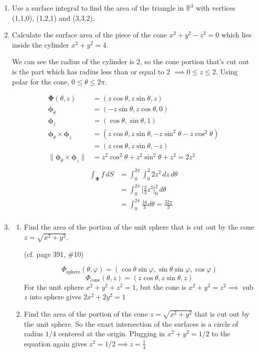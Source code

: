\documentclass{article}
\newcommand{\norm}[1]{\| #1 \|}
\begin{document}
\begin{enumerate}
    \item Use a surface integral to find the area of the triangle in $\mathbb{R}^3$ with vertices (1,1,0), (1,2,1) and (3,3,2).

    \item Calculate the surface area of the piece of the cone $x^2+y^2-z^2 =0$ which lies inside the cylinder $x^2 + y^2 = 4$.
    
    We can see the radius of the cylinder is 2, so the cone portion that's cut out is the part which has radius less than or equal to 2 $\implies 0 \leq z \leq 2$. Using polar for the cone, $0 \leq \theta \leq 2 \pi$.
    \begin{multicols}{2}
    \noindent
    \begin{align*}
        \boldsymbol \Phi (\theta, z) &= (z\cos \theta, z\sin \theta, z) \\
        \boldsymbol \phi_\theta &= (- z \sin \theta, z \cos \theta, 0) \\
        \boldsymbol \phi_z &= ( \cos \theta, \sin \theta, 1) \\
        \boldsymbol \phi_\theta \times \boldsymbol \phi_z &= (z \cos \theta, z \sin \theta, - z \sin^2 \theta - z \cos^2 \theta) \\
        &= (z \cos \theta, z \sin \theta, - z)  \\
        \norm {\boldsymbol \phi_\theta \times \boldsymbol \phi_z }&= z^2 \cos^2 \theta + z^2 \sin^2 \theta + z^2  = 2 z^2\\
    \end{align*}
    \begin{align*}
        \int_{\boldsymbol \Phi} f \, dS &= \int_0^{2\pi} \int_0^2 2z^2 \, dz \, d\theta \\
        &= \int_0^{2\pi} \Big[ \frac{2}{3}z^3\Big]_0^2 \, d\theta \\
        &= \int_0^{2\pi} \frac{16}{3} d\theta =\frac{32\pi}{3} \\
    \end{align*}
    \end{multicols}
    \item
    \begin{enumerate}
        \item Find the area of the portion of the unit sphere that is cut out by the cone $z = \sqrt{x^2+y^2}$.

        (cf. page 391, \#10)

        \[ \Phi_{\text{sphere}} (\theta, \varphi) = (\cos \theta \sin \varphi, \sin \theta \sin \varphi, \cos \varphi) \]
        \[ \Phi_{\text{cone}} (\theta, z) = (z\cos \theta , z\sin \theta, z) \]
        For the unit sphere $x^2 + y^2 + z^2 = 1$, but the cone is $ x^2 + y^2 = z^2 \implies $ sub $z$ into sphere gives $2x^2 + 2y^2 = 1$
        \item Find the area of the portion of the cone $z = \sqrt{x^2+y^2}$ that is cut out by the unit sphere. So the exact intersection of the surfaces is a circle of radius $1/4$ centered at the origin. Plugging in $x^2 +y^2 = 1/2$ to the equation again gives $z^2 = 1/2 \implies z = \frac{1}{4}$
    \end{enumerate}


\end{enumerate}
\end{document}

